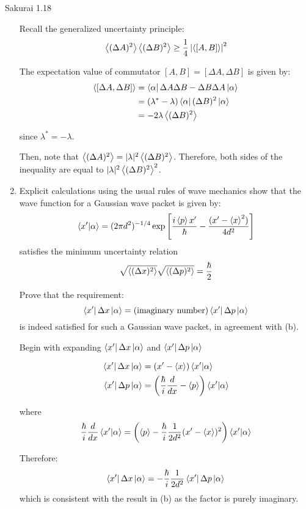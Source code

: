 \documentclass{article}
\begin{document}
\begin{section}{Sakurai 1.18}
\begin{enumerate}
			\begin{tcolorbox}[breakable]
				Recall the generalized uncertainty principle:
				$$
					\left<(\Delta A)^2\right> \left<(\Delta B)^2\right> \geq \frac{1}{4} \left|\left<[A,B]\right>\right|^2
				$$

				The expectation value of commutator $[A,B] = [\Delta A, \Delta B]$ is given by:
				\begin{align*}
					\left<[\Delta A, \Delta B]\right> &= \bra{\alpha}\Delta A \Delta B - \Delta B \Delta A \ket{\alpha} \\
					&= (\lambda^* - \lambda) \bra{\alpha} (\Delta B)^2 \ket{\alpha} \\
					&= -2\lambda \left<(\Delta B)^2\right>
				\end{align*}

				since $\lambda^* = -\lambda$.
				
				Then, note that $\left<(\Delta A)^2\right> = |\lambda|^2 \left<(\Delta B)^2\right>$. Therefore, both sides of the inequality are equal to $|\lambda|^2 \left<(\Delta B)^2\right>^2$.
			\end{tcolorbox}

			\item Explicit calculations using the usual rules of wave mechanics show that the wave function for a Gaussian wave packet is given by:
			$$
				\braket{x'}{\alpha} = (2\pi d^2)^{-1/4} \exp\left[\frac{i \left<p\right>x'}{\hbar} - \frac{(x' - \left<x\right>^2)}{4d^2}\right]
			$$
			satisfies the minimum uncertainty relation
			$$
				\sqrt{\left<(\Delta x)^2\right>} \sqrt{\left<(\Delta p)^2\right>} = \frac{\hbar}{2}
			$$

			Prove that the requirement:
			$$
				\bra{x'}\Delta x\ket{\alpha} = (\text{imaginary number})\bra{x'}\Delta p\ket{\alpha}
			$$
			is indeed satisfied for such a Gaussian wave packet, in agreement with (b).

			\begin{tcolorbox}
				Begin with expanding $\bra{x'}\Delta x\ket{\alpha}$ and $\bra{x'}\Delta p\ket{\alpha}$

				\begin{align*}
					\bra{x'}\Delta x\ket{\alpha} &= (x' - \left<x\right>) \braket{x'}{\alpha} \\
					\bra{x'}\Delta p\ket{\alpha} &= \left(\frac{\hbar}{i} \frac{d}{dx} - \left<p\right>\right) \braket{x'}{\alpha}
				\end{align*}

				where
				\begin{align*}
					\frac{\hbar}{i} \frac{d}{dx} \braket{x'}{\alpha} = 
						\left(\left<p\right> - \frac{\hbar}{i} \frac{1}{2d^2} (x' - \left<x\right>)^2\right) \braket{x'}{\alpha} \\
				\end{align*}

				Therefore:
				\begin{align*}
					\bra{x'}\Delta x\ket{\alpha} = - \frac{\hbar}{i} \frac{1}{2d^2} \bra{x'}\Delta p\ket{\alpha}
				\end{align*}
				which is consistent with the result in (b) as the factor is purely imaginary. 
			\end{tcolorbox}
		\end{enumerate}


	\end{section}
\end{document}
